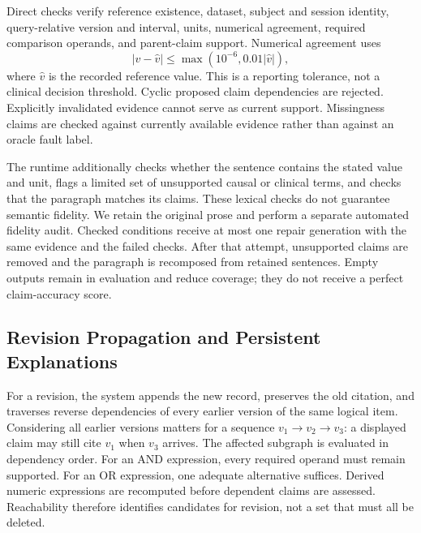 Direct checks verify reference existence, dataset, subject and session identity,
query-relative version and interval, units, numerical agreement, required
comparison operands, and parent-claim support. Numerical agreement uses
\begin{equation}
 |v-\hat v|\leq \max(10^{-6},0.01|\hat v|),
\end{equation}
where $\hat v$ is the recorded reference value. This is a reporting tolerance,
not a clinical decision threshold. Cyclic proposed claim dependencies are
rejected. Explicitly invalidated evidence cannot serve as current support.
Missingness claims are checked against currently available evidence rather than
against an oracle fault label.

The runtime additionally checks whether the sentence contains the stated value
and unit, flags a limited set of unsupported causal or clinical terms, and checks
that the paragraph matches its claims. These lexical checks do not guarantee
semantic fidelity. We retain the original prose and perform a separate automated
fidelity audit. Checked conditions receive at most one repair generation with
the same evidence and the failed checks. After that attempt, unsupported claims
are removed and the paragraph is recomposed from retained sentences. Empty
outputs remain in evaluation and reduce coverage; they do not receive a perfect
claim-accuracy score.

\subsection{Revision Propagation and Persistent Explanations}

For a revision, the system appends the new record, preserves the old citation,
and traverses reverse dependencies of every earlier version of the same logical
item. Considering all earlier versions matters for a sequence $v_1\rightarrow
v_2\rightarrow v_3$: a displayed claim may still cite $v_1$ when $v_3$ arrives.
The affected subgraph is evaluated in dependency order. For an AND expression,
every required operand must remain supported. For an OR expression, one
adequate alternative suffices. Derived numeric expressions are recomputed before
dependent claims are assessed. Reachability therefore identifies candidates for
revision, not a set that must all be deleted.

